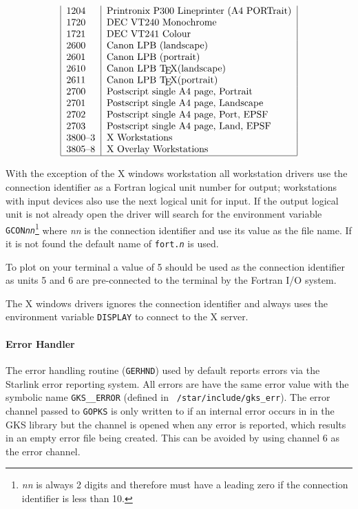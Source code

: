 \begin{table}
\[\begin{tabular}{|l|l|}
1204    & Printronix P300 Lineprinter (A4 PORTrait) \\
1720    & DEC VT240 Monochrome \\
1721    & DEC VT241 Colour \\
2600    & Canon LPB (landscape) \\
2601    & Canon LPB (portrait) \\
2610    & Canon LPB \TeX (landscape) \\
2611    & Canon LPB \TeX (portrait) \\
2700    & Postscript single A4 page, Portrait \\
2701    & Postscript single A4 page, Landscape \\
2702    & Postscript single A4 page, Port, EPSF \\
2703    & Postscript single A4 page, Land, EPSF  \\
3800--3    & X Workstations \\
3805--8    & X Overlay Workstations\\
\hline
\end{tabular}\]\end{table}

With the exception of the X windows workstation all workstation drivers use the
connection identifier as a Fortran logical unit number for output; workstations
with input devices also use the next logical unit for input. If the output
logical unit is not already open the driver will search for the environment
variable {\tt GCON{\em nn}}\footnote{{\em nn} is always 2 digits and therefore
must have a leading zero if the connection identifier is less than 10.} where
{\em nn} is the connection identifier and use its value as the file name. If it
is not found the default name of {\tt fort.{\em n}} is used.

To plot on your terminal a value of 5 should be used as the connection
identifier as units 5 and 6 are pre-connected to the terminal by the Fortran
I/O system.

The X windows drivers ignores the connection identifier and always uses the
environment variable {\tt DISPLAY} to connect to the X server. 

\paragraph{Error Handler} 

The error handling routine ({\tt GERHND}) used by default reports errors via
the Starlink error reporting system. All errors are have the same error value
with the symbolic name {\tt GKS\_\_ERROR} (defined in {\tt
/star/include/gks\_err}). The error channel passed to {\tt GOPKS} is only
written to if an internal error occurs in in the GKS library but the channel is
opened when any error is reported, which results in an empty error file
being created. This can be avoided by using channel 6 as the error channel.

